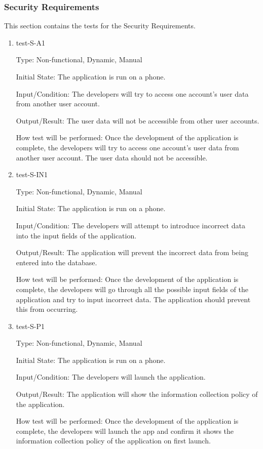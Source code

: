 \documentclass[12pt, titlepage]{article}
\begin{document}
\subsubsection{Security Requirements}

This section contains the tests for the Security Requirements.
		
\begin{enumerate}

\item{test-S-A1\\}

Type: Non-functional, Dynamic, Manual 
					
Initial State: The application is run on a phone.
					
Input/Condition: The developers will try to access one account's user data from another user account.
					
Output/Result: The user data will not be accessible from other user accounts.
					
How test will be performed: Once the development of the application is complete, the developers will try to access one account's user data from another user account. The user data should not be accessible.
					
\item{test-S-IN1\\}

Type: Non-functional, Dynamic, Manual 
					
Initial State: The application is run on a phone.
					
Input/Condition: The developers will attempt to introduce incorrect data into the input fields of the application.
					
Output/Result: The application will prevent the incorrect data from being entered into the database.
					
How test will be performed: Once the development of the application is complete, the developers will go through all the possible input fields of the application and try to input incorrect data. The application should prevent this from occurring. 

\item{test-S-P1\\}

Type: Non-functional, Dynamic, Manual 
					
Initial State: The application is run on a phone.
					
Input/Condition: The developers will launch the application.
					
Output/Result: The application will show the information collection policy of the application.
					
How test will be performed: Once the development of the application is complete, the developers will launch the app and confirm it shows the information collection policy of the application on first launch.
\end{enumerate}
\end{document}
